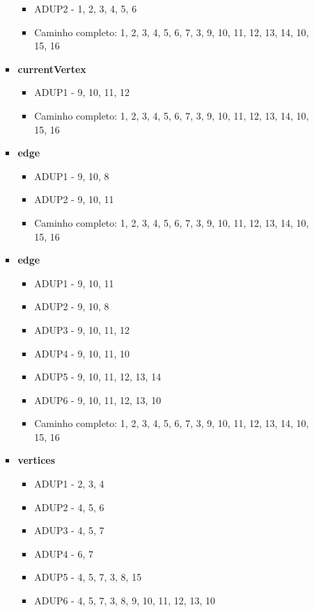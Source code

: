 \documentclass{article}
\begin{document}
\begin{itemize}
\begin{enumerate}
\begin{itemize}
\begin{itemize}
            \item ADUP2 - 1, 2, 3, 4, 5, 6
            \item Caminho completo: 1, 2, 3, 4, 5, 6, 7, 3, 9, 10, 11, 12, 13, 14, 10, 15, 16
        \end{itemize}
        \item \textbf{currentVertex}
        \begin{itemize}
            \item ADUP1 - 9, 10, 11, 12
            \item Caminho completo: 1, 2, 3, 4, 5, 6, 7, 3, 9, 10, 11, 12, 13, 14, 10, 15, 16
        \end{itemize}
        \item \textbf{edge}
        \begin{itemize}
            \item ADUP1 - 9, 10, 8
            \item ADUP2 - 9, 10, 11
            \item Caminho completo: 1, 2, 3, 4, 5, 6, 7, 3, 9, 10, 11, 12, 13, 14, 10, 15, 16
        \end{itemize}
        \item \textbf{edge}
        \begin{itemize}
            \item ADUP1 - 9, 10, 11
            \item ADUP2 - 9, 10, 8
            \item ADUP3 - 9, 10, 11, 12
            \item ADUP4 - 9, 10, 11, 10
            \item ADUP5 - 9, 10, 11, 12, 13, 14
            \item ADUP6 - 9, 10, 11, 12, 13, 10
            \item Caminho completo: 1, 2, 3, 4, 5, 6, 7, 3, 9, 10, 11, 12, 13, 14, 10, 15, 16
        \end{itemize}
        \item \textbf{vertices}
        \begin{itemize}
            \item ADUP1 - 2, 3, 4
            \item ADUP2 - 4, 5, 6
            \item ADUP3 - 4, 5, 7
            \item ADUP4 - 6, 7
            \item ADUP5 - 4, 5, 7, 3, 8, 15
            \item ADUP6 - 4, 5, 7, 3, 8, 9, 10, 11, 12, 13, 10

\end{itemize}
\end{itemize}
\end{enumerate}
\end{itemize}
\end{document}
